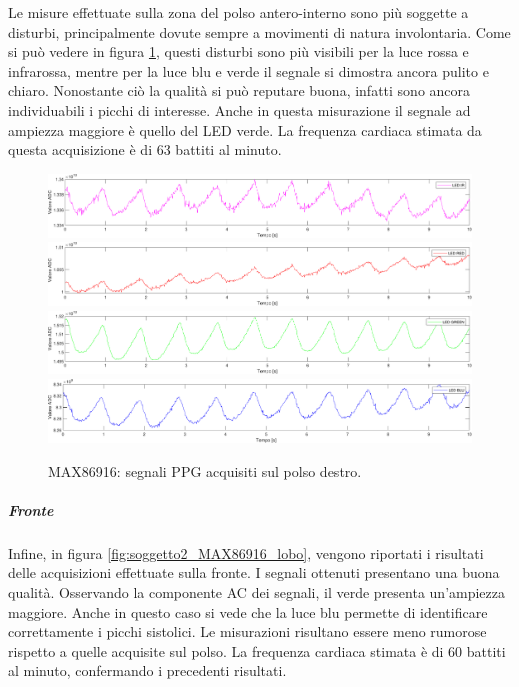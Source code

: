 Le misure effettuate sulla zona del polso antero-interno sono più soggette a disturbi, principalmente dovute sempre a movimenti di natura involontaria. Come si può vedere in figura \ref{fig:soggetto2_MAX86916_polso}, questi disturbi sono più visibili per la luce rossa e infrarossa, mentre per la luce blu e verde il segnale si dimostra ancora pulito e chiaro. Nonostante ciò la qualità si può reputare buona, infatti sono ancora individuabili i picchi di interesse. Anche in questa misurazione il segnale ad ampiezza maggiore è quello del LED verde. La frequenza cardiaca stimata da questa acquisizione è di 63 battiti al minuto.
\begin{figure}[h]
	\centering
	\includegraphics[width=1\linewidth]{ImageFiles/Misure Preliminari/Soggetto 2/max86916/polso_inferiore_ired}
	\includegraphics[width=1\linewidth]{ImageFiles/Misure Preliminari/Soggetto 2/max86916/polso_inferiore_red}
	\includegraphics[width=1\linewidth]{ImageFiles/Misure Preliminari/Soggetto 2/max86916/polso_inferiore_green}
	\includegraphics[width=1\linewidth]{ImageFiles/Misure Preliminari/Soggetto 2/max86916/polso_inferiore_blu}
	\caption{MAX86916: segnali PPG acquisiti sul polso destro.}
	\label{fig:soggetto2_MAX86916_polso}
\end{figure}

\clearpage

\subparagraph{Fronte}
Infine, in figura \ref{fig:soggetto2_MAX86916_lobo}, vengono riportati i risultati delle acquisizioni effettuate sulla fronte. I segnali ottenuti presentano una buona qualità. Osservando la componente AC dei segnali, il verde presenta un'ampiezza maggiore. Anche in questo caso si vede che la luce blu permette di identificare correttamente i picchi sistolici. Le misurazioni risultano essere meno rumorose rispetto a quelle acquisite sul polso. La frequenza cardiaca stimata è di 60 battiti al minuto, confermando i precedenti risultati.

